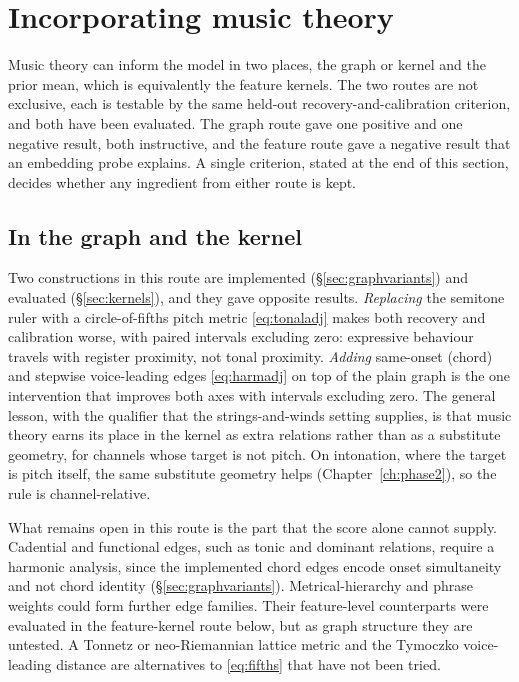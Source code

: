 \section{Incorporating music theory}\label{sec:musictheory}
Music theory can inform the model in two places, the graph or kernel and
the prior mean, which is equivalently the feature kernels. The two routes
are not exclusive, each is testable by the same held-out
recovery-and-calibration criterion, and both have been evaluated. The graph
route gave one positive and one negative result, both instructive, and the
feature route gave a negative result that an embedding probe explains. A
single criterion, stated at the end of this section, decides whether any
ingredient from either route is kept.

\subsection{In the graph and the kernel}
Two constructions in this route are implemented (\S\ref{sec:graphvariants})
and evaluated (\S\ref{sec:kernels}), and they gave opposite results.
\emph{Replacing} the semitone ruler with a circle-of-fifths pitch metric
\eqref{eq:tonaladj} makes both recovery and calibration worse, with paired
intervals excluding zero: expressive behaviour travels with register
proximity, not tonal proximity. \emph{Adding} same-onset (chord) and
stepwise voice-leading edges \eqref{eq:harmadj} on top of the plain graph is
the one intervention that improves both axes with intervals excluding zero.
The general lesson, with the qualifier that the strings-and-winds setting
supplies, is that music theory earns its place in the kernel as extra
relations rather than as a substitute geometry, for channels whose target
is not pitch. On intonation, where the target is pitch itself, the same
substitute geometry helps (Chapter~\ref{ch:phase2}), so the rule is
channel-relative.

What remains open in this route is the part that the score alone cannot
supply. Cadential and functional edges, such as tonic and dominant
relations, require a harmonic analysis, since the implemented chord edges
encode onset simultaneity and not chord identity
(\S\ref{sec:graphvariants}). Metrical-hierarchy and phrase weights could
form further edge families. Their feature-level counterparts were evaluated
in the feature-kernel route below, but as graph structure they are untested.
A Tonnetz or neo-Riemannian lattice metric and the Tymoczko voice-leading
distance are alternatives to \eqref{eq:fifths} that have not been tried.

